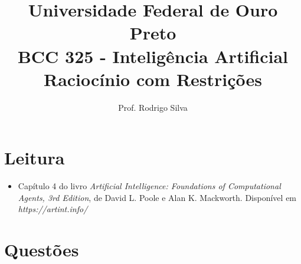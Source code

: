\documentclass{article}
\title{\vspace{-2 cm}Universidade Federal de Ouro Preto \\ BCC 325 - Inteligência Artificial \\ Raciocínio com Restrições}
\author{Prof. Rodrigo Silva}
\date{}
\begin{document}
\maketitle

\section{Leitura}

\begin{itemize}
    \item Capítulo 4 do livro \textit{Artificial Intelligence: Foundations of Computational Agents, 3rd Edition}, de David L. Poole e Alan K. Mackworth. Disponível em \textit{https://artint.info/}
\end{itemize}

\section{Questões}
\end{document}
